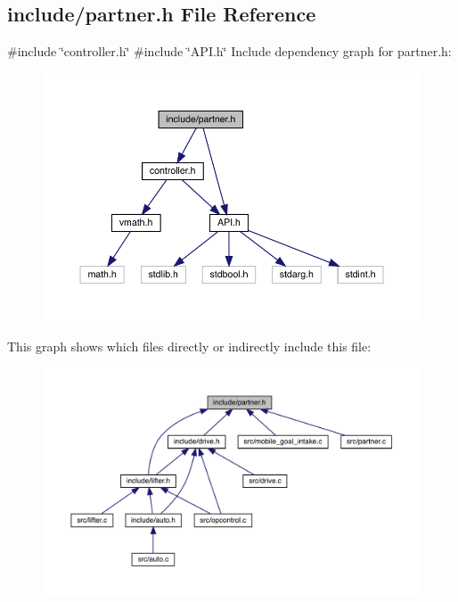 \subsection{include/partner.h File Reference}
\label{partner_8h}
{\ttfamily \#include \char`\"{}controller.\+h\char`\"{}}\newline
{\ttfamily \#include \char`\"{}A\+P\+I.\+h\char`\"{}}\newline
Include dependency graph for partner.\+h\+:\nopagebreak
\begin{figure}[H]
\begin{center}
\leavevmode
\includegraphics[width=350pt]{partner_8h__incl}
\end{center}
\end{figure}
This graph shows which files directly or indirectly include this file\+:\nopagebreak
\begin{figure}[H]
\begin{center}
\leavevmode
\includegraphics[width=350pt]{partner_8h__dep__incl}
\end{center}
\end{figure}
